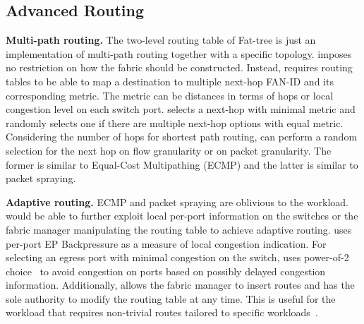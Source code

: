 \subsection{Advanced Routing}
\label{aurelia:sec:design:advanced-routing}
\noindent \textbf{Multi-path routing.}
%
The two-level routing table of Fat-tree is just an implementation of multi-path routing together with a specific topology. \aurelia imposes no restriction on how the fabric should be constructed. Instead, \aurelia requires routing tables to be able to map a destination to multiple next-hop FAN-ID and its corresponding metric. The metric can be distances in terms of hops or local congestion level on each switch port. 
%
\aurelia selects a next-hop with minimal metric and randomly selects one if there are multiple next-hop options with equal metric.  
%
Considering the number of hops for shortest path routing, \aurelia can perform a random selection for the next hop on flow granularity or on packet granularity. The former is similar to Equal-Cost Multipathing (ECMP) and the latter is similar to packet spraying. 

\noindent \textbf{Adaptive routing.}
%
ECMP and packet spraying are oblivious to the workload. 
%
\aurelia would be able to further exploit local per-port information on the switches or the fabric manager manipulating the routing table to achieve adaptive routing.
%
\aurelia uses per-port EP Backpressure as a measure of local congestion indication. 
%
For selecting an egress port with minimal congestion on the switch, \aurelia uses power-of-2 choice~\cite{power-of-two:tpds:2001} to avoid congestion on ports based on possibly delayed congestion information.
%
Additionally, \aurelia allows the fabric manager to insert routes and has the sole authority to modify the routing table at any time.
%
This is useful for the workload that requires non-trivial routes tailored to specific workloads~\cite{gullfoss:tech-report:2015, fractos:eurosys:2022}. 


